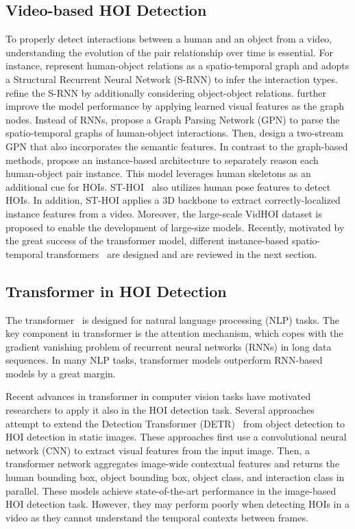 \documentclass[times,twocolumn,final,authoryear]{elsarticle}
\begin{document}
\subsection{Video-based HOI Detection}
To properly detect interactions between a human and an object from a video, understanding the evolution of the pair relationship over time is essential. For instance, \citet{hoi_v_anti:srnn} represent human-object relations as a spatio-temporal graph and adopts a Structural Recurrent Neural Network (S-RNN) to infer the interaction types. \citet{hoi_v_anti:structured_lstm} refine the S-RNN by additionally considering object-object relations. \citet{hoi_v_anti:lighten} further improve the model performance by applying learned visual features as the graph nodes. Instead of RNNs, \citet{hoi_v2:learning_gpn} propose a Graph Parsing Network (GPN) to parse the spatio-temporal graphs of human-object interactions. Then, \citet{hoi_v2:st_gpn} design a two-stream GPN that also incorporates the semantic features. In contrast to the graph-based methods, \citet{hoi_v2:sthoid} propose an instance-based architecture to separately reason each human-object pair instance. This model leverages human skeletons as an additional cue for HOIs. ST-HOI~\citep{hoi_v_set:VidHOI} also utilizes human pose features to detect HOIs. In addition, ST-HOI applies a 3D backbone to extract correctly-localized instance features from a video. Moreover, the large-scale VidHOI dataset is proposed to enable the development of large-size models. Recently, motivated by the great success of the transformer model, different instance-based spatio-temporal transformers~\citep{hoi_v2:detecting_hort, hoi_v2:sttran, hoi_v2:tubelet_tokens} are designed and are reviewed in the next section.

\subsection{Transformer in HOI Detection}
The transformer~\citep{transformer:vanilla} is designed for natural language processing (NLP) tasks. The key component in transformer is the attention mechanism, which copes with the gradient vanishing problem of recurrent neural networks (RNNs) in long data sequences. In many NLP tasks, transformer models outperform RNN-based models by a great margin. 

Recent advances in transformer in computer vision tasks have motivated researchers to apply it also in the HOI detection task. Several approaches~\citep{hoi_i1:hotr, hoi_i1:qpic, hoi_i1:structure_aware_trans, hoi_i1:consistency_learning, hoi_i1:doq} attempt to extend the Detection Transformer (DETR)~\citep{detection:detr} from object detection to HOI detection in static images. These approaches first use a convolutional neural network (CNN) to extract visual features from the input image. Then, a transformer network aggregates image-wide contextual features and returns the human bounding box, object bounding box, object class, and interaction class in parallel. These models achieve state-of-the-art performance in the image-based HOI detection task. However, they may perform poorly when detecting HOIs in a video as they cannot understand the temporal contexts between frames. 
\end{document}

